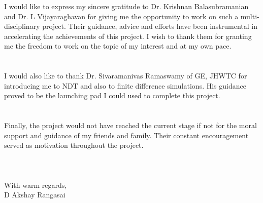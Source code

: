 I would like to express my sincere gratitude to Dr. Krishnan Balasubramanian and Dr. L Vijayaraghavan for giving me the opportunity to work on such a multi-disciplinary project. Their guidance, advice and efforts have been instrumental in
accelerating the achievements of this project. I wish to thank them for granting me the freedom to work on the topic of my interest and at my own pace.
\\ \\ \\
I would also like to thank Dr. Sivaramanivas Ramaswamy of GE, JHWTC for introducing me to NDT and also to finite difference simulations. His guidance proved to be the launching pad I could used to complete this project.
\\ \\ \\
Finally, the project would not have reached the current stage if not for the moral support and guidance of my friends and family. Their constant encouragement served as motivation throughout the project.
\\ \\ \\ \\
With warm regards, \\
D Akshay Rangasai